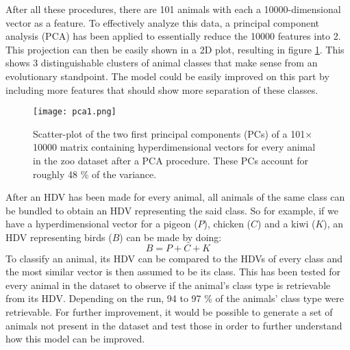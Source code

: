 After all these procedures, there are 101 animals with each a 10000-dimensional vector as a feature. To effectively analyze this data, a principal component analysis (PCA) has been applied to essentially reduce the 10000 features into 2. This projection can then be easily shown in a 2D plot, resulting in figure \ref{fig:exm2}. This shows 3 distinguishable clusters of animal classes that make sense from an evolutionary standpoint. The model could be easily improved on this part by including more features that should show more separation of these classes.
\begin{figure}[h]
    \centering
    \texttt{[image: pca1.png]}
    \caption{Scatter-plot of the two first principal components (PCs) of a 101$\times$10000 matrix containing hyperdimensional vectors for every animal in the zoo dataset after a PCA procedure. These PCs account for roughly 48 \% of the variance.}
    \label{fig:exm2}
\end{figure}

After an HDV has been made for every animal, all animals of the same class can be bundled to obtain an HDV representing the said class. So for example, if we have a hyperdimensional vector for a pigeon ($P$), chicken ($C$) and a kiwi ($K$), an HDV representing birds ($B$) can be made by doing:
\begin{equation}
    B = P + C + K
\end{equation} 
To classify an animal, its HDV can be compared to the HDVs of every class and the most similar vector is then assumed to be its class. This has been tested for every animal in the dataset to observe if the animal's class type is retrievable from its HDV. Depending on the run, 94 to 97 \% of the animals' class type were retrievable. For further improvement, it would be possible to generate a set of animals not present in the dataset and test those in order to further understand how this model can be improved.
